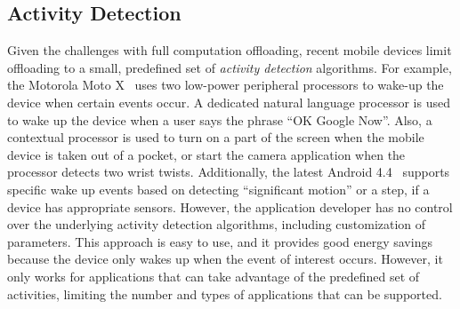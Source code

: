
\subsection{Activity Detection}

Given the challenges with full computation offloading, recent mobile
devices limit offloading to a small, predefined set of \emph{activity
  detection} algorithms. For example, the Motorola Moto X~\cite{motox}
uses two low-power peripheral processors to wake-up the device when
certain events occur. A dedicated natural language processor is used
to wake up the device when a user says the phrase ``OK Google Now''.
Also, a contextual processor is used to turn on a part of the screen
when the mobile device is taken out of a pocket, or start the camera
application when the processor detects two wrist twists. Additionally,
the latest Android 4.4~\cite{android4.4} supports specific wake up
events based on detecting ``significant motion'' or a step, if a device
has appropriate sensors. However, the application developer has no
control over the underlying activity detection algorithms, including
customization of parameters. This approach is easy to use, and it
provides good energy savings because the device only wakes up when the
event of interest occurs. However, it only works for applications that
can take advantage of the predefined set of activities, limiting the
number and types of applications that can be supported.




